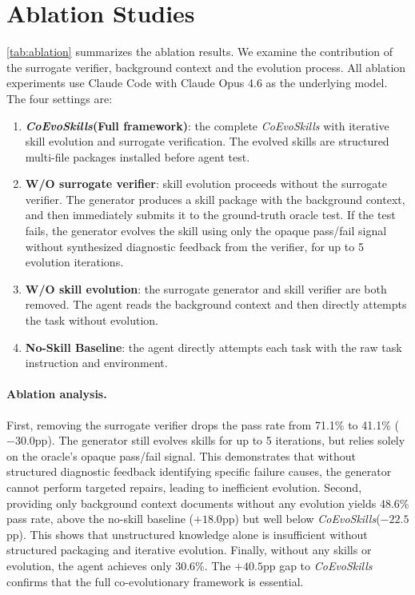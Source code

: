 \documentclass{article}
\newcommand{\method}{\textit{CoEvoSkills}\xspace}
\begin{document}
\section{Ablation Studies}
\label{app:ablation}

\autoref{tab:ablation} summarizes the ablation results. We examine the contribution of the surrogate verifier, background context and the evolution process. All ablation experiments use Claude Code with Claude Opus 4.6 as the underlying model.
The four settings are:
\begin{enumerate}[nosep,leftmargin=*]
\item \textbf{\method (Full framework)}: the complete \method with iterative skill evolution and surrogate verification. The evolved skills are structured multi-file packages installed before agent test.
\item \textbf{W/O surrogate verifier}: skill evolution proceeds without the surrogate verifier. The generator produces a skill package with the background context, and then immediately submits it to the ground-truth oracle test. If the test fails, the generator evolves the skill using only the opaque pass/fail signal without synthesized diagnostic feedback from the verifier, for up to 5 evolution iterations.
\item \textbf{W/O skill evolution}: the surrogate generator and skill verifier are both removed. The agent reads the background context and then directly attempts the task without evolution.
\item \textbf{No-Skill Baseline}: the agent directly attempts each task with the raw task instruction and environment.
\end{enumerate}

\paragraph{Ablation analysis.}
First, removing the surrogate verifier drops the pass rate from 71.1\% to 41.1\% ($-30.0$pp). The generator still evolves skills for up to 5 iterations, but relies solely on the oracle's opaque pass/fail signal. This demonstrates that without structured diagnostic feedback identifying specific failure causes, the generator cannot perform targeted repairs, leading to inefficient evolution. Second, providing only background context documents without any evolution yields 48.6\% pass rate, above the no-skill baseline ($+18.0$pp) but well below \method ($-22.5$pp). This shows that unstructured knowledge alone is insufficient without structured packaging and iterative evolution. Finally, without any skills or evolution, the agent achieves only 30.6\%. The $+40.5$pp gap to \method confirms that the full co-evolutionary framework is essential.
\end{document}
